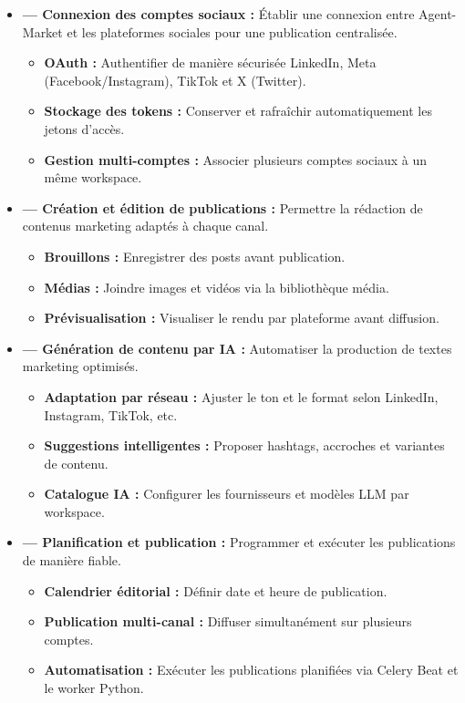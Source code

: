 \documentclass[12pt,a4paper]{report}
\numberwithin{figure}{chapter}
\numberwithin{table}{chapter}
\begin{document}
\begin{itemize}[leftmargin=2em,itemsep=6pt]
\item[] \textbf{--- Connexion des comptes sociaux :} Établir une connexion entre Agent-Market et les plateformes sociales pour une publication centralisée.
\begin{itemize}[label=$\checkmark$,leftmargin=2em,itemsep=3pt]
\item \textbf{OAuth :} Authentifier de manière sécurisée LinkedIn, Meta (Facebook/Instagram), TikTok et X (Twitter).
\item \textbf{Stockage des tokens :} Conserver et rafraîchir automatiquement les jetons d’accès.
\item \textbf{Gestion multi-comptes :} Associer plusieurs comptes sociaux à un même workspace.
\end{itemize}

\item[] \textbf{--- Création et édition de publications :} Permettre la rédaction de contenus marketing adaptés à chaque canal.
\begin{itemize}[label=$\checkmark$,leftmargin=2em,itemsep=3pt]
\item \textbf{Brouillons :} Enregistrer des posts avant publication.
\item \textbf{Médias :} Joindre images et vidéos via la bibliothèque média.
\item \textbf{Prévisualisation :} Visualiser le rendu par plateforme avant diffusion.
\end{itemize}

\item[] \textbf{--- Génération de contenu par IA :} Automatiser la production de textes marketing optimisés.
\begin{itemize}[label=$\checkmark$,leftmargin=2em,itemsep=3pt]
\item \textbf{Adaptation par réseau :} Ajuster le ton et le format selon LinkedIn, Instagram, TikTok, etc.
\item \textbf{Suggestions intelligentes :} Proposer hashtags, accroches et variantes de contenu.
\item \textbf{Catalogue IA :} Configurer les fournisseurs et modèles LLM par workspace.
\end{itemize}

\item[] \textbf{--- Planification et publication :} Programmer et exécuter les publications de manière fiable.
\begin{itemize}[label=$\checkmark$,leftmargin=2em,itemsep=3pt]
\item \textbf{Calendrier éditorial :} Définir date et heure de publication.
\item \textbf{Publication multi-canal :} Diffuser simultanément sur plusieurs comptes.
\item \textbf{Automatisation :} Exécuter les publications planifiées via Celery Beat et le worker Python.
\end{itemize}


\end{itemize}
\end{document}

